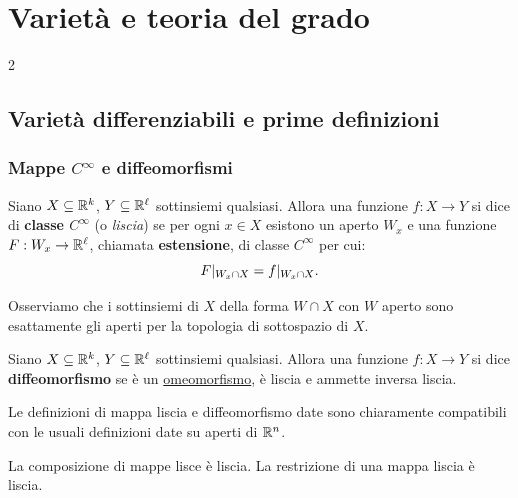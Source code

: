\chapter{Varietà e teoria del grado}
\setlength{\parindent}{2pt}

\begin{multicols*}{2}
    \section{Varietà differenziabili e prime definizioni}

    \subsection{Mappe \texorpdfstring{$C^\infty$}{C∞} e diffeomorfismi}

    \begin{definition} Siano $X \subseteq \mathbb{R}^k$,
        $Y \subseteq \mathbb{R}^\ell$ sottinsiemi qualsiasi. Allora una funzione
        $f : X \to Y$ si dice di \textbf{classe $C^\infty$} (o \textit{liscia}) se per ogni
        $x \in X$ esistono un aperto $W_x$ e una funzione $F : W_x \to \mathbb{R}^\ell$,
        chiamata \textbf{estensione}, di classe $C^\infty$ per cui:
        \[
            F\arrowvert_{W_x \cap X} = f\arrowvert_{W_x \cap X}.
        \]
    \end{definition}

    \begin{remark}
        Osserviamo che i sottinsiemi di $X$ della forma $W \cap X$ con $W$ aperto sono esattamente gli
        aperti per la topologia di sottospazio di $X$.
    \end{remark}

    \begin{definition}[Diffeomorfismo]
        Siano $X \subseteq \mathbb{R}^k$,
        $Y \subseteq \mathbb{R}^\ell$ sottinsiemi qualsiasi.
        Allora una funzione $f : X \to Y$ si dice \textbf{diffeomorfismo} se
        è un \underline{omeomorfismo}, è liscia e ammette inversa liscia.
    \end{definition}

    \begin{remark}
        Le definizioni di mappa liscia e diffeomorfismo date sono chiaramente compatibili
        con le usuali definizioni date su aperti di $\mathbb{R}^n$.
    \end{remark}

    \begin{proposition} \label{prop:comp_liscia}
        La composizione di mappe lisce è liscia. La restrizione di una mappa liscia
        è liscia.
    \end{proposition}


\end{multicols*}
